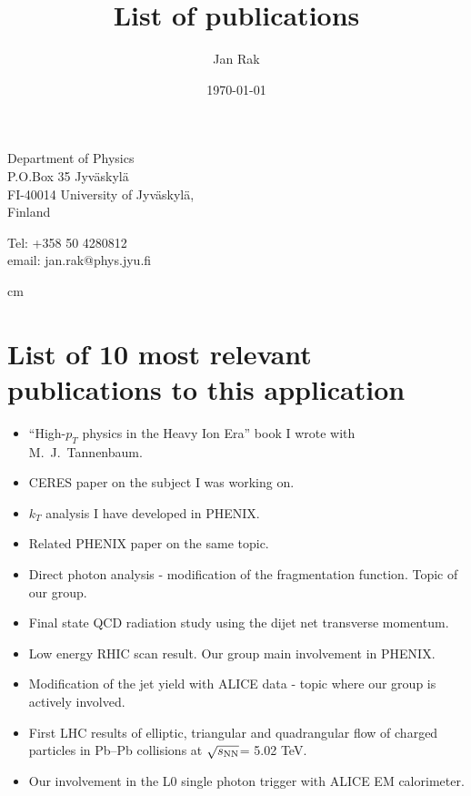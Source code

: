 \documentclass[12pt]{article}
\title{List of publications}
\date{\today}
\author{Jan Rak}
\begin{document}
\maketitle

\parbox{7cm}{
Department of Physics \\
P.O.Box 35 Jyv\"askyl\"a\\
FI-40014 University of Jyv\"askyl\"a,\\ 
Finland}
\hfill
\parbox{5cm}{
Tel: +358 50 4280812\\
email: jan.rak@phys.jyu.fi\\
}

 cm

\section{List of 10 most relevant publications to this application}
\begin{itemize}
\item \cite{JanRak2013} ``High-$p_{T}$ physics in the Heavy Ion Era'' book I wrote with M.~J.~Tannenbaum.
\item \cite{Agakichiev:2003gg} CERES paper on the subject I was working on.
\item \cite{Adler:2006sc} $k_{T}$ analysis I have developed in PHENIX.
\item \cite{Adler:2005ad} Related PHENIX paper on the same topic. %
\item \cite{Adare:2010yw} Direct photon analysis - modification of the fragmentation function. Topic of our group. %
\item \cite{Adam:2015xea} Final state QCD radiation study using the dijet net transverse momentum.
\item \cite{Adare:2012uk}  Low energy RHIC scan result. Our group main involvement in PHENIX. %
\item \cite{Aamodt:2011vg} Modification of the jet yield with ALICE data - topic where our group is actively involved. %
\item \cite{Adam:2016izf} First LHC results of elliptic, triangular and quadrangular flow of charged particles in Pb--Pb collisions at $\sqrt{s_{\rm NN}}$= 5.02 TeV.

\item \cite{Kral:2012ae} Our involvement in the L0 single photon trigger with ALICE EM calorimeter.
\end{itemize}
\end{document}
